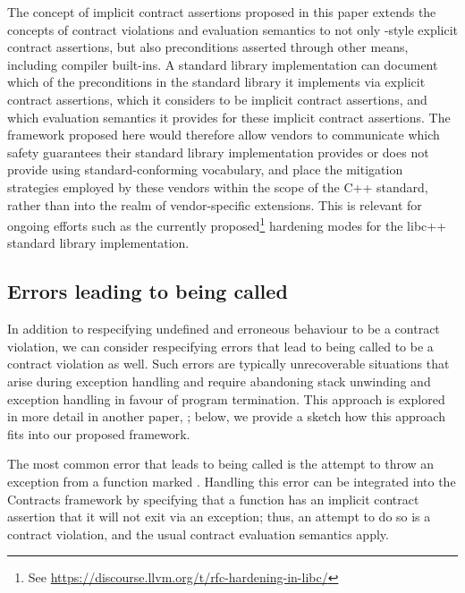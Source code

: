 The concept of implicit contract assertions proposed in this paper extends the concepts of contract violations and evaluation semantics to not only \cite{P2900R6}-style explicit contract assertions, but also preconditions asserted through other means, including compiler built-ins. A standard library implementation can document which of the preconditions in the standard library it implements via explicit contract assertions, which it considers to be implicit contract assertions, and which evaluation semantics it provides for these implicit contract assertions. The framework proposed here would therefore allow vendors to communicate which safety guarantees their standard library implementation provides or does not provide using standard-conforming vocabulary, and place the mitigation strategies employed by these vendors within the scope of the C++ standard, rather than into the realm of vendor-specific extensions. This is relevant for ongoing efforts such as the currently proposed\footnote{See \url{https://discourse.llvm.org/t/rfc-hardening-in-libc/}} hardening modes for the libc++ standard library implementation.

\subsection{Errors leading to  being called}

In addition to respecifying undefined and erroneous behaviour to be a contract violation, we can consider respecifying errors that lead to  being called to be a contract violation as well. Such errors are typically unrecoverable situations that arise during exception handling and require abandoning stack unwinding and exception handling in favour of program termination. This approach is explored in more detail in another paper, \cite{P3205R0}; below, we provide a sketch how this approach fits into our proposed framework.

The most common error that leads to  being called is the attempt to throw an exception from a function marked . Handling this error can be integrated into the Contracts framework by specifying that a  function has an implicit contract assertion that it will not exit via an exception; thus, an attempt to do so is a contract violation, and the usual contract evaluation semantics apply.

